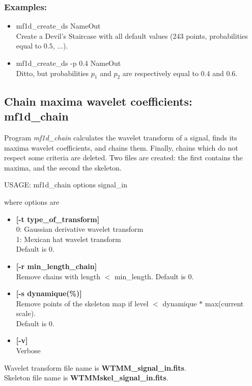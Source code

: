 \subsubsection*{Examples:}
\begin{itemize}
\item mf1d\_create\_ds NameOut \\
Create a Devil's Staircase  with all default values (243 points,
probabilities equal to $0.5$, ...).
\item mf1d\_create\_ds -p 0.4 NameOut \\
Ditto, but probabilities $p_1$ and $p_2$ are respectively equal to $0.4$ and
$0.6$.
\end{itemize}



\subsection{Chain maxima wavelet coefficients: mf1d\_chain}

Program {\em mf1d\_chain} calculates the wavelet transform of a signal,
finds its maxima wavelet coefficients, and chains them. Finally, chains which
do not respect some criteria are deleted. Two files are created: the first
contains the maxima, and the second the skeleton.
{\bf
\begin{center}
 USAGE:  mf1d\_chain options  signal\_in
\end{center}}
where options are 
\begin{itemize}
\item {\bf [-t type\_of\_transform]} \\
0: Gaussian derivative wavelet transform \\
1: Mexican hat wavelet transform  \\
Default is 0.
\item {\bf [-r min\_length\_chain]} \\
Remove chains with length $<$ min\_length. Default is 0.
\item {\bf [-s  dynamique(\%)]} \\
Remove points of the skeleton map 
if level $<$ dynamique $*$ max(current scale). \\
Default is 0.
\item {\bf [-v]} \\
Verbose
\end{itemize}
Wavelet transform file name is {\bf WTMM\_signal\_in.fits}. \\
Skeleton file name is {\bf WTMMskel\_signal\_in.fits}.

